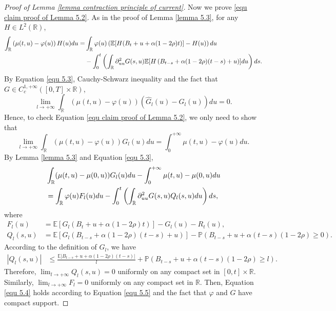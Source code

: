 \documentclass[reqno,11pt]{amsart}
\numberwithin{equation}{section}
\newcommand{\R}{\mathbb{R}}
\begin{document}
\begin{proof}[Proof of Lemma \ref{lemma contraction principle of current}]
	Now we prove \eqref{equ claim proof of Lemma 5.2}.  
	As in the proof of Lemma \ref{lemma 5.3}, for any $H\in L^2(\R)$, 
	\begin{align}\label{equ 5.3}
		\int_{\R}\left(\mu(t,u)-\varphi (u)\right)H(u)du=&\int_{\R}\varphi (u)\left(\mathbb{E}[H(B_t+u+\alpha(1-2\rho)t)]-H(u)\right)du \\
		&-\int_0^t\left(\int_{\R}\partial_{uu}^2G (s,u)\mathbb{E}[H\left(B_{t-s}+\alpha(1-2\rho)(t-s)+u\right)] du\right)ds\notag. 
	\end{align}
	By Equation \eqref{equ 5.3}, Cauchy-Schwarz inequality and the fact that $G \in C_c^{1,+\infty}([0, T]\times \R)$, 
	\[
	\lim_{l\rightarrow+\infty}\int_{\R}(\mu(t, u)- \varphi (u))(\hat{G}_l(u)-G_l(u))du=0. 
	\]
	Hence, to check Equation \eqref{equ claim proof of Lemma 5.2}, we only need to show that
	\begin{equation}\label{equ 5.4}
		\lim_{l\rightarrow+\infty}\int_{\R}(\mu(t, u)-\varphi (u)) G_l (u)du=\int_0^{+\infty}\mu(t, u)-\varphi (u) du.
	\end{equation}
	By Lemma \ref{lemma 5.3} and Equation \eqref{equ 5.3},
	\begin{align}\label{equ 5.5}
		&\int_{\R}(\mu(t, u)-\mu(0,u))G_l(u)du-\int_0^{+\infty}\mu(t, u)-\mu(0,u)du \notag\\
		&=\int_{\R} \varphi (u) F_l(u)du-\int_0^t\left(\int_{\R}\partial_{uu}^2 G (s,u)Q_l(s,u)du\right)ds,
	\end{align}
	where
	\begin{align*}
		F_l(u) &=\mathbb{E}[G_l(B_t+u+\alpha(1-2\rho)t)]-G_l(u)-R_t(u),\\
		Q_l(s,u)&=\mathbb{E}[G_l\left(B_{t-s}+\alpha(1-2\rho)(t-s)+u\right)]-\mathbb{P}(B_{t-s}+u+\alpha(t-s)(1-2\rho)\geq 0).
	\end{align*}
	According to the definition of $G_l$, we have
	\begin{align*}
		|Q_l(s,u)|&\leq \frac{\mathbb{E}|B_{t-s}+u+\alpha(1-2\rho)(t-s)|}{l}+\mathbb{P}\left(B_{t-s}+u+\alpha(t-s)(1-2\rho)\geq l\right).  
	\end{align*}
	Therefore, $\lim_{l\rightarrow+\infty}Q_l (s,u)=0$ uniformly on any compact set in $ [0, t]\times \R$. Similarly, $\lim_{l\rightarrow+\infty}F_l=0$ uniformly on any compact set in $\R$. Then, Equation \eqref{equ 5.4} holds according to Equation \eqref{equ 5.5} and the fact that $\varphi$ and $G$ have compact support. 
	

\end{proof}
\end{document}
